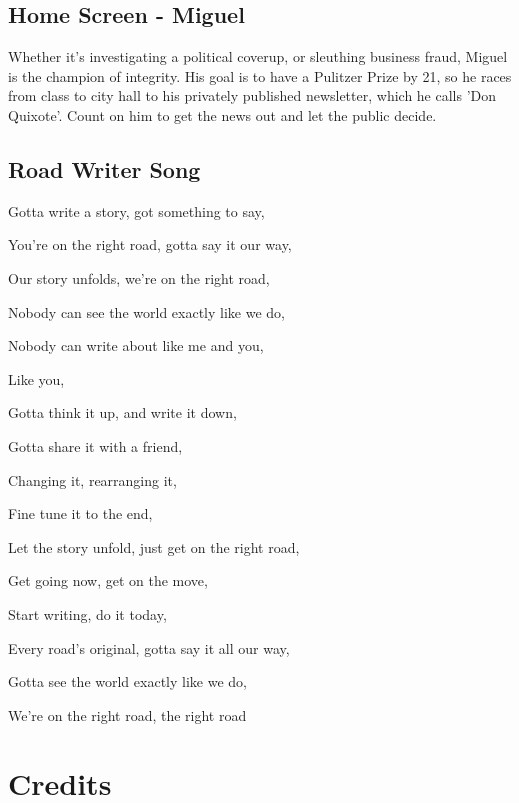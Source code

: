 \subsection{Home Screen - Miguel}

Whether it's investigating a political coverup, or sleuthing business fraud, Miguel is the champion of integrity.
His goal is to have a Pulitzer Prize by 21, so he races from class to city hall to his privately published newsletter, which he calls 'Don Quixote'.
Count on him to get the news out and let the public decide.

\subsection{Road Writer Song}

Gotta write a story, got something to say,

You're on the right road, gotta say it our way,

Our story unfolds, we're on the right road,

Nobody can see the world exactly like we do,

Nobody can write about like me and you,

Like you,

Gotta think it up, and write it down,

Gotta share it with a friend,

Changing it, rearranging it,

Fine tune it to the end,

Let the story unfold, just get on the right road,

Get going now, get on the move,

Start writing, do it today,

Every road's original, gotta say it all our way,

Gotta see the world exactly like we do,

We're on the right road, the right road

\section{Credits}

